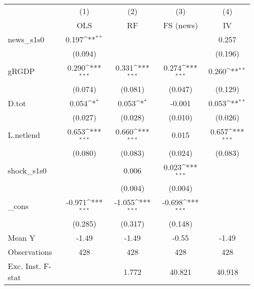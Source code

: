 {
\def\sym#1{\ifmmode^{#1}\else\(^{#1}\)\fi}
\begin{tabular}{l*{4}{c}}
\toprule
            &\multicolumn{1}{c}{(1)}&\multicolumn{1}{c}{(2)}&\multicolumn{1}{c}{(3)}&\multicolumn{1}{c}{(4)}\\
            &\multicolumn{1}{c}{OLS}&\multicolumn{1}{c}{RF}&\multicolumn{1}{c}{FS (news)}&\multicolumn{1}{c}{IV}\\
\midrule
news\_s1s0   &       0.197\sym{**} &                     &                     &       0.257         \\
            &     (0.094)         &                     &                     &     (0.196)         \\
\addlinespace
gRGDP       &       0.290\sym{***}&       0.331\sym{***}&       0.274\sym{***}&       0.260\sym{**} \\
            &     (0.074)         &     (0.081)         &     (0.047)         &     (0.129)         \\
\addlinespace
D.tot       &       0.054\sym{*}  &       0.053\sym{*}  &      -0.001         &       0.053\sym{**} \\
            &     (0.027)         &     (0.028)         &     (0.010)         &     (0.026)         \\
\addlinespace
L.netlend   &       0.653\sym{***}&       0.660\sym{***}&       0.015         &       0.657\sym{***}\\
            &     (0.080)         &     (0.083)         &     (0.024)         &     (0.083)         \\
\addlinespace
shock\_s1s0  &                     &       0.006         &       0.023\sym{***}&                     \\
            &                     &     (0.004)         &     (0.004)         &                     \\
\addlinespace
\_cons      &      -0.971\sym{***}&      -1.055\sym{***}&      -0.698\sym{***}&                     \\
            &     (0.285)         &     (0.317)         &     (0.148)         &                     \\
\midrule
Mean Y      &       -1.49         &       -1.49         &       -0.55         &       -1.49         \\
Observations&         428         &         428         &         428         &         428         \\
Exc. Inst. F-stat&                     &       1.772         &      40.821         &      40.918         \\
\bottomrule
\end{tabular}
}
